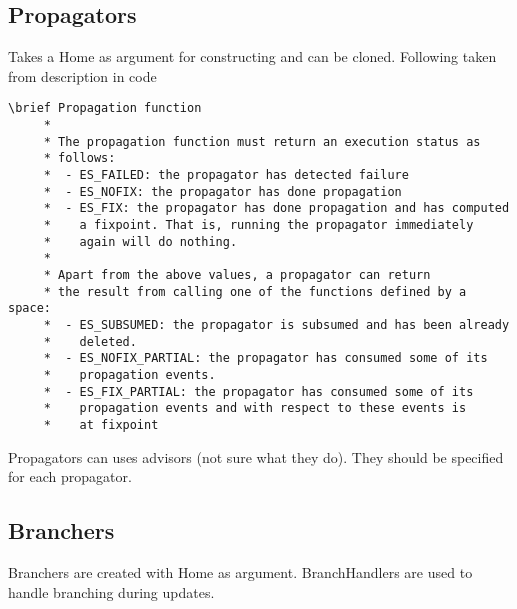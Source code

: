 \documentclass[a4paper,10pt]{article}
\begin{document}
\subsection{Propagators}
Takes a Home as argument for constructing and can be cloned. Following taken from description in code \\ 
\begin{verbatim}
\brief Propagation function
     *
     * The propagation function must return an execution status as
     * follows:
     *  - ES_FAILED: the propagator has detected failure
     *  - ES_NOFIX: the propagator has done propagation
     *  - ES_FIX: the propagator has done propagation and has computed
     *    a fixpoint. That is, running the propagator immediately
     *    again will do nothing.
     *
     * Apart from the above values, a propagator can return
     * the result from calling one of the functions defined by a space:
     *  - ES_SUBSUMED: the propagator is subsumed and has been already
     *    deleted.
     *  - ES_NOFIX_PARTIAL: the propagator has consumed some of its
     *    propagation events.
     *  - ES_FIX_PARTIAL: the propagator has consumed some of its
     *    propagation events and with respect to these events is
     *    at fixpoint
\end{verbatim}
Propagators can uses advisors (not sure what they do). They should be specified for each propagator. 
\subsection{Branchers}
Branchers are created with Home as argument. BranchHandlers are used to handle branching during updates. 
\end{document}
